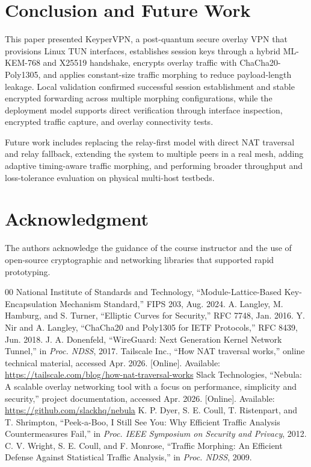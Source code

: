 \documentclass[conference]{IEEEtran}
\begin{document}
\section{Conclusion and Future Work}
This paper presented KeyperVPN, a post-quantum secure overlay VPN that provisions Linux TUN interfaces, establishes session keys through a hybrid ML-KEM-768 and X25519 handshake, encrypts overlay traffic with ChaCha20-Poly1305, and applies constant-size traffic morphing to reduce payload-length leakage. Local validation confirmed successful session establishment and stable encrypted forwarding across multiple morphing configurations, while the deployment model supports direct verification through interface inspection, encrypted traffic capture, and overlay connectivity tests.

Future work includes replacing the relay-first model with direct NAT traversal and relay fallback, extending the system to multiple peers in a real mesh, adding adaptive timing-aware traffic morphing, and performing broader throughput and loss-tolerance evaluation on physical multi-host testbeds.

\section*{Acknowledgment}
The authors acknowledge the guidance of the course instructor and the use of open-source cryptographic and networking libraries that supported rapid prototyping.

\begin{thebibliography}{00}
 National Institute of Standards and Technology, ``Module-Lattice-Based Key-Encapsulation Mechanism Standard,'' FIPS 203, Aug. 2024.
 A. Langley, M. Hamburg, and S. Turner, ``Elliptic Curves for Security,'' RFC 7748, Jan. 2016.
 Y. Nir and A. Langley, ``ChaCha20 and Poly1305 for IETF Protocols,'' RFC 8439, Jun. 2018.
 J. A. Donenfeld, ``WireGuard: Next Generation Kernel Network Tunnel,'' in \emph{Proc. NDSS}, 2017.
 Tailscale Inc., ``How NAT traversal works,'' online technical material, accessed Apr. 2026. [Online]. Available: \url{https://tailscale.com/blog/how-nat-traversal-works}
 Slack Technologies, ``Nebula: A scalable overlay networking tool with a focus on performance, simplicity and security,'' project documentation, accessed Apr. 2026. [Online]. Available: \url{https://github.com/slackhq/nebula}
 K. P. Dyer, S. E. Coull, T. Ristenpart, and T. Shrimpton, ``Peek-a-Boo, I Still See You: Why Efficient Traffic Analysis Countermeasures Fail,'' in \emph{Proc. IEEE Symposium on Security and Privacy}, 2012.
 C. V. Wright, S. E. Coull, and F. Monrose, ``Traffic Morphing: An Efficient Defense Against Statistical Traffic Analysis,'' in \emph{Proc. NDSS}, 2009.
\end{thebibliography}
\end{document}
